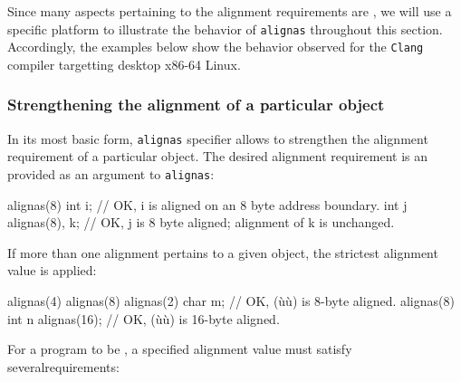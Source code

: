 Since many aspects pertaining to the alignment requirements are , we will use a specific platform to illustrate the behavior of \lstinline!alignas! throughout this section.  Accordingly, the examples below show the behavior observed for the \lstinline!Clang! compiler targetting desktop x86-64 Linux.


\subsubsection[Strengthening the alignment of a particular object]{Strengthening the alignment of a particular object}\label{restricting-the-alignment-of-a-particular-object}\label{strengthening-the-alignment-of-a-particular-object}

In its most basic form, \lstinline!alignas! specifier allows to strengthen the alignment requirement of a particular object. The desired alignment requirement is an  provided as an argument to \lstinline!alignas!:

\begin{emcppslisting}
alignas(8) int i;    // OK, i is aligned on an 8 byte address boundary.
int j alignas(8), k; // OK, j is 8 byte aligned; alignment of k is unchanged.
\end{emcppslisting}

\noindent If more than one alignment pertains to a given object, the strictest alignment value is applied:

\begin{emcppslisting}
alignas(4) alignas(8) alignas(2) char m;  // OK, (ù{}ù) is 8-byte aligned.
alignas(8) int n alignas(16);             // OK, (ù{}ù) is 16-byte aligned.
\end{emcppslisting}

\noindent For a program to be , a specified alignment value
must satisfy several\linebreak[4] \mbox{requirements}:

